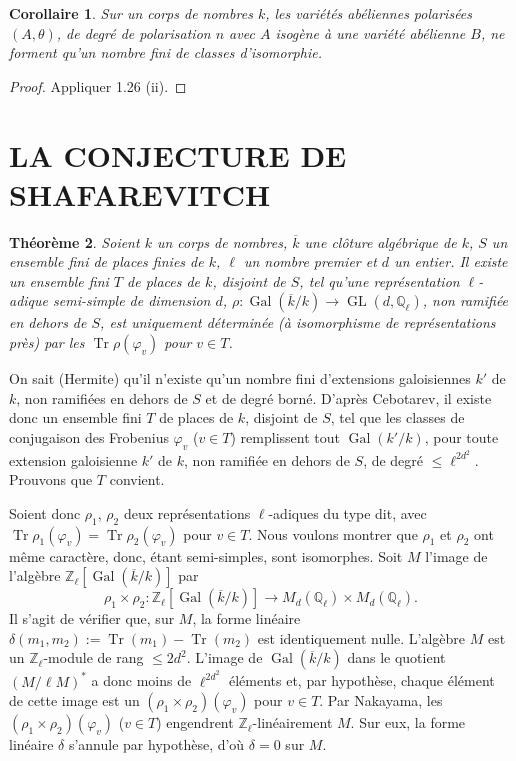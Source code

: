 \documentclass[12pt,a4paper]{article}
\theoremstyle{plain}
\newtheorem{theorem}{Théorème}[section]
\newtheorem{corollary}[theorem]{Corollaire}
\theoremstyle{definition}
\theoremstyle{remark}
\DeclareMathOperator{\Gal}{Gal}
\DeclareMathOperator{\GL}{GL}
\DeclareMathOperator{\Tr}{Tr}
\newcommand{\QQ}{\mathbb{Q}}
\newcommand{\ZZ}{\mathbb{Z}}
\providecommand{\QQ}{\mathbb{Q}}
\providecommand{\ZZ}{\mathbb{Z}}
\providecommand{\Gal}{\operatorname{Gal}}
\providecommand{\GL}{\operatorname{GL}}
\providecommand{\Tr}{\operatorname{Tr}}
\begin{document}
\begin{corollary}
Sur un corps de nombres $k$, les variétés abéliennes polarisées $(A,\theta)$, de degré de polarisation $n$ avec $A$ isogène à une variété abélienne $B$, ne forment qu'un nombre fini de classes d'isomorphie.
\end{corollary}

\begin{proof}
Appliquer 1.26 (ii).
\end{proof}


\section{LA CONJECTURE DE SHAFAREVITCH}

\begin{theorem}
Soient $k$ un corps de nombres, $\overline{k}$ une clôture algébrique de $k$, $S$ un ensemble fini de places finies de $k$, $\ell$ un nombre premier et $d$ un entier. Il existe un ensemble fini $T$ de places de $k$, disjoint de $S$, tel qu'une représentation $\ell$-adique semi-simple de dimension $d$, $\rho : \Gal(\overline{k}/k) \to \GL(d, \QQ_\ell)$, non ramifiée en dehors de $S$, est uniquement déterminée (à isomorphisme de représentations près) par les $\Tr \rho(\varphi_v)$ pour $v \in T$.
\end{theorem}

On sait (Hermite) qu'il n'existe qu'un nombre fini d'extensions galoisiennes $k'$ de $k$, non ramifiées en dehors de $S$ et de degré borné. D'après Cebotarev, il existe donc un ensemble fini $T$ de places de $k$, disjoint de $S$, tel que les classes de conjugaison des Frobenius $\varphi_v$ ($v \in T$) remplissent tout $\Gal(k'/k)$, pour toute extension galoisienne $k'$ de $k$, non ramifiée en dehors de $S$, de degré $\leq \ell^{2d^2}$. Prouvons que $T$ convient.

Soient donc $\rho_1$, $\rho_2$ deux représentations $\ell$-adiques du type dit, avec $\Tr \rho_1(\varphi_v) = \Tr \rho_2(\varphi_v)$ pour $v \in T$. Nous voulons montrer que $\rho_1$ et $\rho_2$ ont même caractère, donc, étant semi-simples, sont isomorphes. Soit $M$ l'image de l'algèbre $\ZZ_\ell[\Gal(\overline{k}/k)]$ par
\[
\rho_1 \times \rho_2 : \ZZ_\ell[\Gal(\overline{k}/k)] \longrightarrow M_d(\QQ_\ell) \times M_d(\QQ_\ell).
\]
Il s'agit de vérifier que, sur $M$, la forme linéaire $\delta(m_1, m_2) := \Tr(m_1) - \Tr(m_2)$ est identiquement nulle. L'algèbre $M$ est un $\ZZ_\ell$-module de rang $\leq 2d^2$. L'image de $\Gal(\overline{k}/k)$ dans le quotient $(M/\ell M)^*$ a donc moins de $\ell^{2d^2}$ éléments et, par hypothèse, chaque élément de cette image est un $(\rho_1 \times \rho_2)(\varphi_v)$ pour $v \in T$. Par Nakayama, les $(\rho_1 \times \rho_2)(\varphi_v)$ ($v \in T$) engendrent $\ZZ_\ell$-linéairement $M$. Sur eux, la forme linéaire $\delta$ s'annule par hypothèse, d'où $\delta = 0$ sur $M$.
\end{document}

